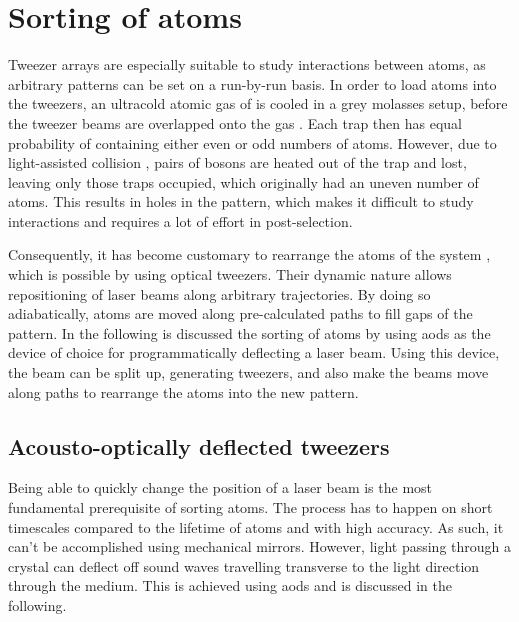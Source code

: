 \chapter{Sorting of atoms}


Tweezer arrays are especially suitable to study interactions between atoms, as arbitrary patterns can be set on a run-by-run basis. In order to load atoms into the tweezers, an ultracold atomic gas of  is cooled in a grey molasses setup, before the tweezer beams are overlapped onto the gas \cite{Duda2017}. Each trap then has equal probability of containing either even or odd numbers of atoms. However, due to light-assisted collision \cite{Cooper2018}, pairs of bosons are heated out of the trap and lost, leaving only those traps occupied, which originally had an uneven number of atoms. This results in holes in the pattern, which makes it difficult to study interactions and requires a lot of effort in post-selection.

Consequently, it has become customary to rearrange the atoms of the system \cite{Barredo2016, Endres2016}, which is possible by using optical tweezers. Their dynamic nature allows repositioning of laser beams along arbitrary trajectories. By doing so adiabatically, atoms are moved along pre-calculated paths to fill gaps of the pattern. In the following is discussed the sorting of atoms by using \acp{aod} as the device of choice for programmatically deflecting a laser beam. Using this device, the beam can be split up, generating tweezers, and also make the beams move along paths to rearrange the atoms into the new pattern.


\section{Acousto-optically deflected tweezers}

Being able to quickly change the position of a laser beam is the most fundamental prerequisite of sorting atoms. The process has to happen on short timescales compared to the lifetime of atoms and with high accuracy. As such, it can't be accomplished using mechanical mirrors. However, light passing through a crystal can deflect off sound waves travelling transverse to the light direction through the medium. This is achieved using \acp{aod} and is discussed in the following.


